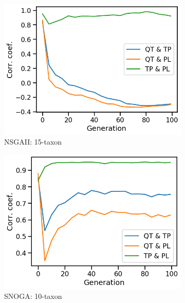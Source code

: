 \begin{figure}[!htbp]
\begin{subfigure}[b]{0.3\textwidth}
			\includegraphics[width=\textwidth]{Figure/15-taxon_NSGAII_corr_plot}
			\caption{NSGAII: 15-taxon}
		\end{subfigure}    
		\begin{subfigure}[b]{0.3\textwidth}
			\includegraphics[width=\textwidth]{Figure/10-taxon_NOSSGA_corr_plot}
			\caption{SNOGA: 10-taxon}
		\end{subfigure}%
		\begin{subfigure}[b]{0.3\textwidth}

\end{subfigure}
\end{figure}
